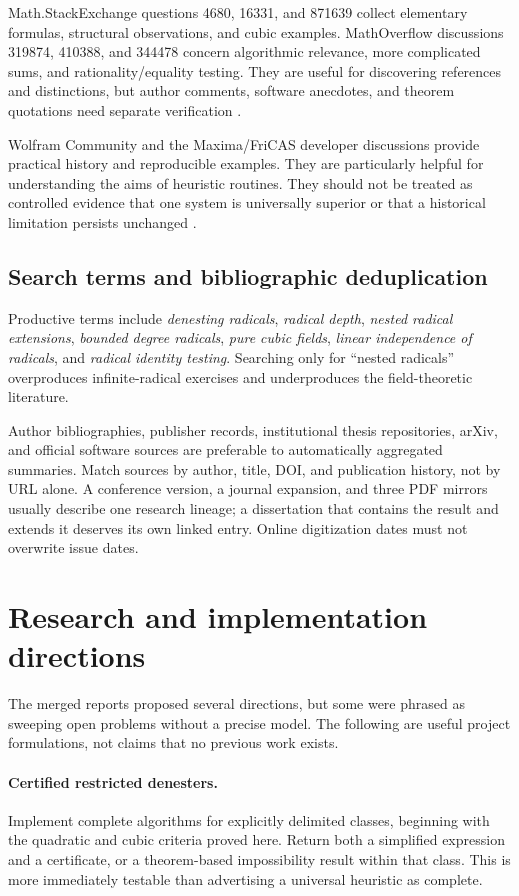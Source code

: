 \documentclass[11pt,letterpaper]{article}
\numberwithin{equation}{section}
\theoremstyle{definition}
\theoremstyle{remark}
\begin{document}
Math.StackExchange questions 4680, 16331, and 871639 collect elementary formulas, structural observations, and cubic examples. MathOverflow discussions 319874, 410388, and 344478 concern algorithmic relevance, more complicated sums, and rationality/equality testing. They are useful for discovering references and distinctions, but author comments, software anecdotes, and theorem quotations need separate verification \cite{mse,mo}.

Wolfram Community and the Maxima/FriCAS developer discussions provide practical history and reproducible examples. They are particularly helpful for understanding the aims of heuristic routines. They should not be treated as controlled evidence that one system is universally superior or that a historical limitation persists unchanged \cite{wolframcommunity,maxima,fricas}.

\subsection{Search terms and bibliographic deduplication}
Productive terms include \emph{denesting radicals}, \emph{radical depth}, \emph{nested radical extensions}, \emph{bounded degree radicals}, \emph{pure cubic fields}, \emph{linear independence of radicals}, and \emph{radical identity testing}. Searching only for ``nested radicals'' overproduces infinite-radical exercises and underproduces the field-theoretic literature.

Author bibliographies, publisher records, institutional thesis repositories, arXiv, and official software sources are preferable to automatically aggregated summaries. Match sources by author, title, DOI, and publication history, not by URL alone. A conference version, a journal expansion, and three PDF mirrors usually describe one research lineage; a dissertation that contains the result and extends it deserves its own linked entry. Online digitization dates must not overwrite issue dates.

\section{Research and implementation directions}\label{sec:directions}
The merged reports proposed several directions, but some were phrased as sweeping open problems without a precise model. The following are useful project formulations, not claims that no previous work exists.

\paragraph{Certified restricted denesters.} Implement complete algorithms for explicitly delimited classes, beginning with the quadratic and cubic criteria proved here. Return both a simplified expression and a certificate, or a theorem-based impossibility result within that class. This is more immediately testable than advertising a universal heuristic as complete.
\end{document}
